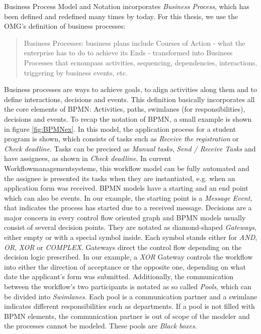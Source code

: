 Business Process Model and Notation incorporates \textit{Business Process}, which has been defined and redefined many times by today. For this thesis, we use the OMG's definition of business processes: 
\begin{quote}
Business Processes: business plans include Courses of Action - what the enterprise has to do to achieve its Ends - transformed into Business Processes that ecnompass activities, sequencing, dependencies, interactions, triggering by business events, etc. \cite{bmm2015}
\end{quote}

Business processes are ways to achieve goals, to align activities along them and to define interactions, decisions and events. This definition basically incorporates all the core elements of BPMN: Activities, paths, swimlanes (for responsibilities), decisions and events. To recap the notation of BPMN, a small example is shown in figure \ref{fig:BPMNex}. 
In this model, the application process for a student program is shown, which consists of tasks such as \textit{Receive the registration} or \textit{Check deadline}. Tasks can be precised as \textit{Manual tasks}, \textit{Send / Receive Tasks} and have assignees, as shown in \textit{Check deadline}. In current Workflowmanagementsystems, this workflow model can be fully automated and the assignee is presented its tasks when they are instantiated, e.g. when an application form was received. BPMN models have a starting and an end point which can also be events. In our example, the starting point is a \textit{Message Event}, that indicates the process has started due to a received message. 
Decisions are a major concern in every control flow oriented graph and BPMN models usually consist of several decision points. They are notated as diamond-shaped \textit{Gateways}, either empty or with a special symbol inside. Each symbol stands either for \textit{AND}, \textit{OR}, \textit{XOR} or \textit{COMPLEX}. Gateways direct the control flow depending on the decision logic prescribed. In our example, a \textit{XOR} Gateway controls the workflow into either the direction of acceptance or the opposite one, depending on what date the applicant's form was submitted. Additionally, the communication between the workflow's two participants is notated as so called \textit{Pools}, which can be divided into \textit{Swimlanes}. Each pool is a communication partner and a swimlane indicates different responsibilities such as departments. If a pool is not filled with BPMN elements, the communication partner is out of scope of the modeler and the processes cannot be modeled. These pools are \textit{Black boxes}. 

